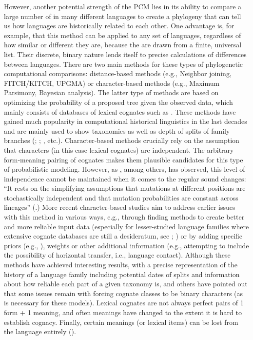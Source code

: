 \documentclass[output=paper,colorlinks,citecolor=brown]{langscibook}
\begin{document}
However, another potential strength of the PCM lies in its ability to compare a large number of  in many different languages to create a phylogeny that can tell us how languages are historically related to each other. One advantage is, for example, that this method can be applied to any set of languages, regardless of how similar or different they are, because the  are drawn from a finite, universal list. Their discrete, binary nature lends itself to precise calculations of differences between languages. There are two main methods for these types of phylogenetic computational comparisons: distance-based methods (e.g., Neighbor joining, FITCH/KITCH, UPGMA) or character-based methods (e.g., Maximum Parsimony, Bayesian analysis). The latter type of methods are based on optimizing the probability of a proposed tree given the observed data, which mainly consists of databases of lexical cognates such as \citet{mm:dyen_indoeuropean_1992}. These methods have gained much popularity in computational historical linguistics in the last decades and are mainly used to show taxonomies as well as depth of splits of family branches (\citealt{mm:holden_bantu_2002}; \citealt{mm:atkinson_qd_curious_2005}; \citealt{mm:bouckaert2012mapping}, etc.). Character-based methods crucially rely on the assumption that characters (in this case lexical cognates) are independent. The arbitrary form-meaning pairing of cognates makes them plausible candidates for this type of probabilistic modeling. However, as \citet{mm:jager_phylogenetic_2013}, among others, has observed, this level of independence cannot be maintained when it comes to the regular sound changes: ``It rests on the simplifying assumptions that mutations at different positions are stochastically independent and that mutation probabilities are constant across lineages'' (\cite[286]{mm:jager_phylogenetic_2013}.) More recent character-based studies aim to address earlier issues with this method in various ways, e.g., through finding methods to create better and more reliable input data (especially for lesser-studied language families where extensive cognate databases are still a desideratum, see \citealt{mm:list_concepticon_2016}; \citeyear{mm:list_potential_2017}) or by adding specific priors (e.g., \citealt{mm:rama2018three}), weights or other additional information (e.g., \citealt{mm:neureiter2022detecting} attempting to include the possibility of horizontal transfer, i.e., language contact). Although these methods have achieved interesting results, with a precise representation of the history of a language family including potential dates of splits and information about how reliable each part of a given taxonomy is, \citet{mm:hammarstrom_computational_2019} and others have pointed out that some issues remain with forcing cognate classes to be binary characters (as is necessary for these models). Lexical cognates are not always perfect pairs of 1 form + 1 meaning, and often meanings have changed to the extent it is hard to establish cognacy. Finally, certain meanings (or lexical items) can be lost from the language entirely (\citealt{mm:meelenetal2022cognates}).
\end{document}
